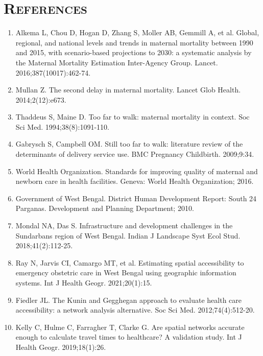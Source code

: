 \documentclass[10pt,twocolumn,letterpaper]{article}
\begin{document}
\section*{\large\scshape References}
\small
\begin{enumerate}
\item Alkema L, Chou D, Hogan D, Zhang S, Moller AB, Gemmill A, et al. Global, regional, and national levels and trends in maternal mortality between 1990 and 2015, with scenario-based projections to 2030: a systematic analysis by the Maternal Mortality Estimation Inter-Agency Group. Lancet. 2016;387(10017):462-74.
\item Mullan Z. The second delay in maternal mortality. Lancet Glob Health. 2014;2(12):e673.
\item Thaddeus S, Maine D. Too far to walk: maternal mortality in context. Soc Sci Med. 1994;38(8):1091-110.
\item Gabrysch S, Campbell OM. Still too far to walk: literature review of the determinants of delivery service use. BMC Pregnancy Childbirth. 2009;9:34.
\item World Health Organization. Standards for improving quality of maternal and newborn care in health facilities. Geneva: World Health Organization; 2016.
\item Government of West Bengal. District Human Development Report: South 24 Parganas. Development and Planning Department; 2010.
\item Mondal NA, Das S. Infrastructure and development challenges in the Sundarbans region of West Bengal. Indian J Landscape Syst Ecol Stud. 2018;41(2):112-25.
\item Ray N, Jarvis CI, Camargo MT, et al. Estimating spatial accessibility to emergency obstetric care in West Bengal using geographic information systems. Int J Health Geogr. 2021;20(1):15.
\item Fiedler JL. The Kunin and Gegghegan approach to evaluate health care accessibility: a network analysis alternative. Soc Sci Med. 2012;74(4):512-20.
\item Kelly C, Hulme C, Farragher T, Clarke G. Are spatial networks accurate enough to calculate travel times to healthcare? A validation study. Int J Health Geogr. 2019;18(1):26.
\end{enumerate}
\end{document}
